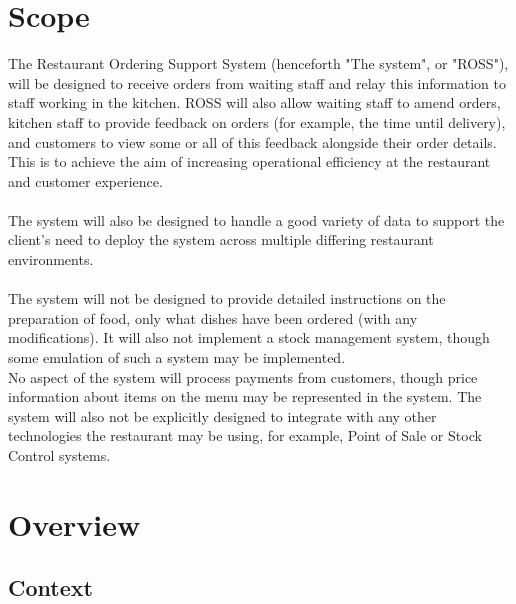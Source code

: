 \documentclass[11pt, a4paper]{report}
\begin{document}
\section{Scope} \label{sec:Scope}
The Restaurant Ordering Support System (henceforth "The system", or "ROSS"), will be designed to receive orders from waiting staff and relay this information to staff working in the kitchen. ROSS will also allow waiting staff to amend orders, kitchen staff to provide feedback on orders (for example, the time until delivery), and customers to view some or all of this feedback alongside their order details. This is to achieve the aim of increasing operational efficiency at the restaurant and customer experience.\\
\\
The system will also be designed to handle a good variety of data to support the client's need to deploy the system across multiple differing restaurant environments.\\
\\
The system will not be designed to provide detailed instructions on the preparation of food, only what dishes have been ordered (with any modifications). It will also not implement a stock management system, though some emulation of such a system may be implemented.\\
No aspect of the system will process payments from customers, though price information about items on the menu may be represented in the system. The system will also not be explicitly designed to integrate with any other technologies the restaurant may be using, for example, Point of Sale or Stock Control systems.

\section{Overview} \label{sec:Overview}
\subsection{Context} \label{subsec:Context}
\end{document}
